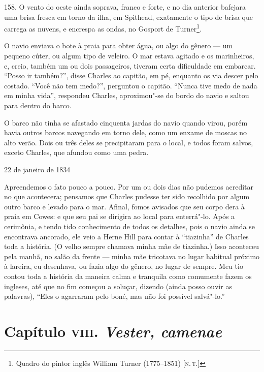 158. O vento do oeste ainda soprava, franco e forte, e no dia anterior
bafejara uma brisa fresca em torno da ilha, em Spithead, exatamente o
tipo de brisa que carrega as nuvens, e encrespa as ondas, no Gosport de
Turner\footnote{Quadro do pintor inglês William Turner (1775--1851) {[}\textsc{n.\,t.}{]}}.

O navio enviava o bote à praia para obter água, ou algo do gênero --- um
pequeno cúter, ou algum tipo de veleiro. O mar estava agitado e os
marinheiros, e, creio, também um ou dois passageiros, tiveram certa
dificuldade em embarcar. ``Posso ir também?'', disse Charles ao capitão,
em pé, enquanto os via descer pelo costado. ``Você não tem medo?'',
perguntou o capitão. ``Nunca tive medo de nada em minha vida'',
respondeu Charles, aproximou"-se do bordo do navio e saltou para dentro
do barco.

O barco não tinha se afastado cinquenta jardas do navio quando virou,
porém havia outros barcos navegando em torno dele, como um enxame de
moscas no alto verão. Dois ou três deles se precipitaram para o local, e
todos foram salvos, exceto Charles, que afundou como uma pedra.

\begin{center}
22 de janeiro de 1834
\end{center}

Apreendemos o fato pouco a pouco. Por um ou dois dias não pudemos
acreditar no que acontecera; pensamos que Charles pudesse ter sido
recolhido por algum outro barco e levado para o mar. Afinal, fomos
avisados que seu corpo dera à praia em Cowes: e que seu pai se dirigira
ao local para enterrá"-lo. Após a cerimônia, e tendo tido conhecimento de
todos os detalhes, pois o navio ainda se encontrava ancorado, ele veio a
Herne Hill para contar à ``tiazinha'' de Charles toda a história. (O
velho sempre chamava minha mãe de tiazinha.) Isso aconteceu pela manhã,
no salão da frente --- minha mãe tricotava no lugar habitual próximo à
lareira, eu desenhava, ou fazia algo do gênero, no lugar de sempre. Meu
tio contou toda a história da maneira calma e tranquila como comumente
fazem os ingleses, até que no fim começou a soluçar, dizendo (ainda
posso ouvir as palavras), ``Eles o agarraram pelo boné, mas não foi
possível salvá"-lo.''


\chapter{Capítulo \textsc{viii}. \textit{Vester, camenae}}

